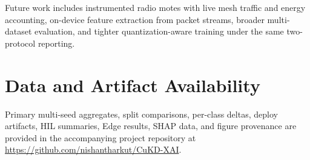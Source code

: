 \documentclass[journal]{IEEEtran}
\begin{document}
Future work includes instrumented radio motes with live mesh traffic and energy accounting, on-device feature extraction from packet streams, broader multi-dataset evaluation, and tighter quantization-aware training under the same two-protocol reporting.

\section*{Data and Artifact Availability}
Primary multi-seed aggregates, split comparisons, per-class deltas, deploy artifacts, HIL summaries, Edge results, SHAP data, and figure provenance are provided in the accompanying project repository at \url{https://github.com/nishantharkut/CuKD-XAI}.



\end{document}
